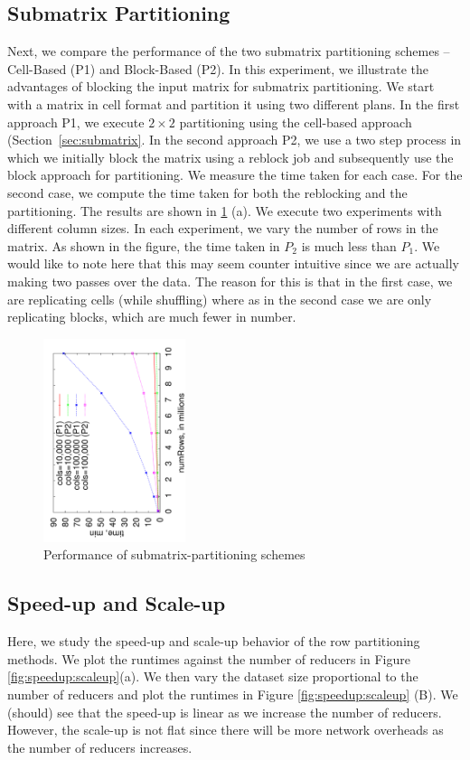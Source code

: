 \documentclass{vldb}
\begin{document}
\subsection{Submatrix Partitioning}
Next, we compare the performance of the two submatrix partitioning schemes -- Cell-Based (P1)
and Block-Based (P2). In this experiment, we illustrate the advantages of
blocking the input matrix for submatrix partitioning. We start with a matrix in
cell format and partition it using two different plans. In the first approach P1, we
execute $2\times 2$ partitioning using the cell-based approach
(Section~\ref{sec:submatrix}. In the second approach P2, we use a two step process in which we
initially block the matrix using a reblock job and subsequently use the
block approach for partitioning. We measure the time taken for each case. For
the second case, we compute the time taken for both the reblocking and the
partitioning. The results are shown in \ref{fig:submatrix} (a). We execute
two experiments with different column sizes. In each experiment, we vary the
number of rows in the matrix.
As shown in the figure, the time taken in $P_2$ is much less than $P_1$. We
would like to note here that this may seem counter intuitive
since we are actually making two passes over the data. The reason for this is
that in the first case, we are replicating cells (while shuffling) where as in
the second case we are only replicating blocks, which are much fewer in number.

\begin{figure}[h]
\centering
\includegraphics[angle=-90,width=1.64in]{optimization.pdf}
\caption{Performance of submatrix-partitioning schemes}
\label{fig:submatrix}
\end{figure}

\subsection{Speed-up and Scale-up}
Here, we study the speed-up and scale-up behavior of the row partitioning methods.
We plot the runtimes against the number of reducers in
Figure \ref{fig:speedup:scaleup}(a). We then vary the dataset size proportional
to the number of reducers and plot the runtimes in Figure \ref{fig:speedup:scaleup} (B).
We (should) see that the speed-up is linear as we increase the number of reducers.
However, the scale-up is not flat since there will be more network overheads as the
number of reducers increases.
\end{document}
